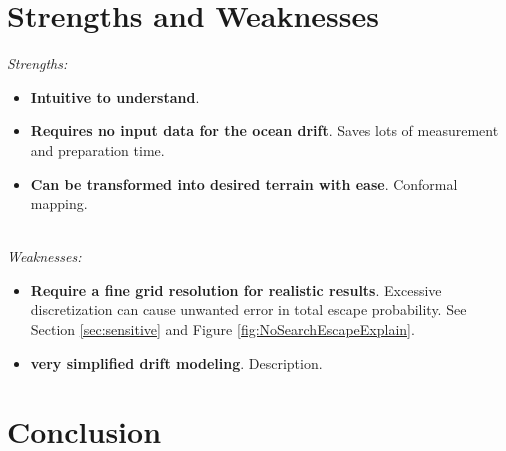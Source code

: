 \documentclass[12pt, letterpaper]{article}  %
\theoremstyle{definition}
\theoremstyle{remark}
\theoremstyle{plain}
\begin{document}
\section{Strengths and Weaknesses}\label{sec:sandw}


\textit{Strengths:}
\begin{itemize}
\item \textbf{Intuitive to understand}. 
\item \textbf{Requires no input data for the ocean drift}. Saves lots of measurement and preparation time.
\item \textbf{Can be transformed into desired terrain with ease}.  Conformal mapping.
\end{itemize}
\ \\
\noindent \textit{Weaknesses:}
\begin{itemize}
\item \textbf{Require a fine grid resolution for realistic results}. Excessive discretization can cause unwanted error in total escape probability. See Section \ref{sec:sensitive} and Figure \ref{fig:NoSearchEscapeExplain}.
\item \textbf{very simplified drift modeling}.  Description.
\end{itemize}








\section{Conclusion}\label{sec:conclusion}

\end{document}
